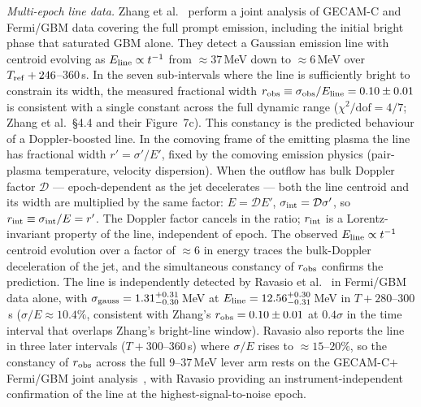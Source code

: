 \documentclass[aps,prd,onecolumn,amsmath,amssymb]{revtex4-2}
\begin{document}
\textit{Multi-epoch line data.}
Zhang et al.~\cite{YQZhang2024} perform a joint analysis of GECAM-C and
Fermi/GBM data covering the full prompt emission, including the initial
bright phase that saturated GBM alone.  They detect a Gaussian emission
line with centroid evolving as $E_{\rm line}\propto t^{-1}$ from
$\approx37$\,MeV down to $\approx6$\,MeV over $T_{\rm ref}+246$--$360$\,s.
In the seven sub-intervals where the line is sufficiently bright to
constrain its width, the measured fractional width
$r_{\rm obs}\equiv\sigma_{\rm obs}/E_{\rm line} = 0.10\pm0.01$ is
consistent with a single constant across the full dynamic range
($\chi^2/\mathrm{dof}=4/7$; Zhang et al.\ \S4.4 and their Figure~7c).
This constancy is the predicted behaviour of a Doppler-boosted line.
In the comoving frame of the emitting plasma the line has fractional
width $r' = \sigma'/E'$, fixed by the comoving emission physics
(pair-plasma temperature, velocity dispersion).  When the outflow has
bulk Doppler factor $\mathcal{D}$ --- epoch-dependent as the jet
decelerates --- both the line centroid and its width are multiplied by
the same factor: $E = \mathcal{D}E'$, $\sigma_{\rm int} =
\mathcal{D}\sigma'$, so $r_{\rm int} \equiv \sigma_{\rm int}/E = r'$.
The Doppler factor cancels in the ratio; $r_{\rm int}$ is a
Lorentz-invariant property of the line, independent of epoch.  The
observed $E_{\rm line}\propto t^{-1}$ centroid evolution over a factor
of $\approx 6$ in energy traces the bulk-Doppler deceleration of the
jet, and the simultaneous constancy of $r_{\rm obs}$ confirms the
prediction.  The line is independently detected by Ravasio et
al.~\cite{Ravasio2024} in Fermi/GBM data alone, with
$\sigma_{\rm gauss}=1.31^{+0.31}_{-0.30}$\,MeV at
$E_{\rm line}=12.56^{+0.30}_{-0.31}$\,MeV in $T+280$--$300$\,s
($\sigma/E\approx 10.4\%$, consistent with Zhang's
$r_{\rm obs}=0.10\pm0.01$ at $0.4\sigma$ in the time interval that
overlaps Zhang's bright-line window).  Ravasio also reports the line
in three later intervals ($T+300$--$360$\,s) where $\sigma/E$ rises
to $\approx 15$--$20\%$, so the constancy of $r_{\rm obs}$ across the
full $9$--$37$\,MeV lever arm rests on the GECAM-C$+$Fermi/GBM joint
analysis~\cite{YQZhang2024}, with Ravasio providing an
instrument-independent confirmation of the line at the
highest-signal-to-noise epoch.
\end{document}
